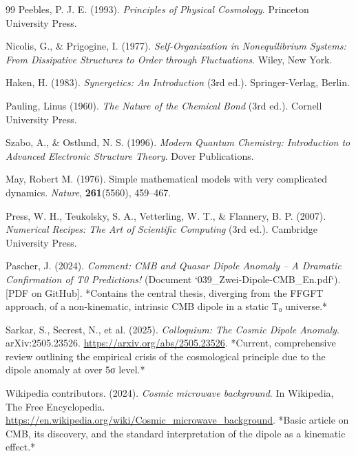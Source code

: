 \documentclass[12pt,a4paper]{article}
\begin{document}
\begin{thebibliography}{99}
		Peebles, P. J. E. (1993). \textit{Principles of Physical Cosmology}. 
		Princeton University Press.
		
		Nicolis, G., \& Prigogine, I. (1977). \textit{Self-Organization in Nonequilibrium Systems: From Dissipative Structures to Order through Fluctuations}. 
		Wiley, New York.
		
		Haken, H. (1983). \textit{Synergetics: An Introduction} (3rd ed.). 
		Springer-Verlag, Berlin.
		
		Pauling, Linus (1960). \textit{The Nature of the Chemical Bond} (3rd ed.). 
		Cornell University Press.
		
		Szabo, A., \& Ostlund, N. S. (1996). \textit{Modern Quantum Chemistry: Introduction to Advanced Electronic Structure Theory}. 
		Dover Publications.
		
		May, Robert M. (1976). Simple mathematical models with very complicated dynamics. 
		\textit{Nature}, \textbf{261}(5560), 459--467.
		
		Press, W. H., Teukolsky, S. A., Vetterling, W. T., \& Flannery, B. P. (2007). \textit{Numerical Recipes: The Art of Scientific Computing} (3rd ed.). 
		Cambridge University Press.
		
		Pascher, J. (2024). \textit{Comment: CMB and Quasar Dipole Anomaly – A Dramatic Confirmation of T0 Predictions!} (Document `039\_Zwei-Dipole-CMB\_En.pdf`).
		[PDF on GitHub].
		*Contains the central thesis, diverging from the FFGFT approach, of a non-kinematic, intrinsic CMB dipole in a static T₀ universe.*
		
		Sarkar, S., Secrest, N., et al. (2025). \textit{Colloquium: The Cosmic Dipole Anomaly}. 
		arXiv:2505.23526.
		\href{https://arxiv.org/abs/2505.23526}{https://arxiv.org/abs/2505.23526}.
		*Current, comprehensive review outlining the empirical crisis of the cosmological principle due to the dipole anomaly at over 5σ level.*
		
		Wikipedia contributors. (2024). \textit{Cosmic microwave background}. 
		In Wikipedia, The Free Encyclopedia.
		\href{https://en.wikipedia.org/wiki/Cosmic_microwave_background}{https://en.wikipedia.org/wiki/Cosmic\_microwave\_background}.
		*Basic article on CMB, its discovery, and the standard interpretation of the dipole as a kinematic effect.*
		

\end{thebibliography}
\end{document}
